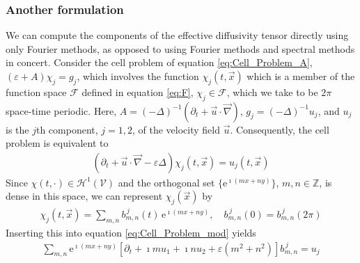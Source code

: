 \documentclass[11pt]{amsart}
\newcommand{\e}{\mathrm{e}}
\newcommand{\Vc}{\mathcal{V}}
\newcommand{\Hc}{\mathcal{H}}
\newcommand{\Fc}{\mathcal{F}}
\begin{document}
\subsubsection{Another formulation}
%
We can compute the components of the effective diffusivity
tensor directly using only Fourier methods, as opposed to using Fourier
methods and spectral methods in concert. Consider the cell problem
of equation \eqref{eq:Cell_Problem_A}, $(\varepsilon+A)\chi_j=g_j$, which involves the
function $\chi_j(t,\vec{x})$ which is a member of the function space $\Fc$
defined in equation \eqref{eq:F}, $\chi_j\in\Fc$, which we take to be $2\pi$
space-time periodic. Here, $A=(-\Delta)^{-1}(\partial_t+\vec{u}\cdot\vec{\nabla})$,
$g_j=(-\Delta)^{-1}u_j$, and $u_j$ is the $j$th component, $j=1,2$, of
the velocity field $\vec{u}$. Consequently, the cell problem is
equivalent to 
%
\begin{align}\label{eq:Cell_Problem_A_mod}
  (\partial_t+\vec{u}\cdot\vec{\nabla}-\varepsilon\Delta)\chi_j(t,\vec{x})=u_j(t,\vec{x})
\end{align}
%
Since $\chi(t,\cdot)\in\Hc^1(\Vc)$ and the orthogonal set $\{\e^{\imath (mx+ny)}\}$, 
$m,n\in\mathbb{Z}$, is dense in this space, we can represent
$\chi_j(\vec{x})$ by  
%
\begin{align}\label{eq:x_Expansion}
  \chi_j(t,\vec{x})=\sum_{m,n}b^{\,j}_{m,n}(t)\,\e^{\imath (mx+ny)}, \quad
  b^{\,j}_{m,n}(0)=b^{\,j}_{m,n}(2\pi)
\end{align}
%  
Inserting this into equation \eqref{eq:Cell_Problem_mod} yields 
%
\begin{align}\label{eq:Cell_Problem_Fourier}
  \sum_{m,n}\e^{\imath (mx+ny)}[\partial_t+\imath mu_1+\imath nu_2+\varepsilon(m^2+n^2)]b^{\,j}_{m,n}=u_j
\end{align}
%
\end{document}
